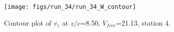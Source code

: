 \begin{figure}[H]
\centering
\texttt{[image: figs/run\_34/run\_34\_W\_contour]}
\caption{Contour plot of $\overline{v_{z}}$ at $z/c$=8.50, $V_{free}$=21.13, station 4.}
\label{fig:run_34_W_contour}
\end{figure}


